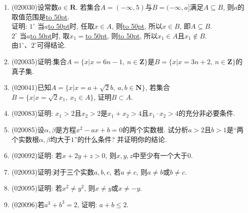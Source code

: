 \documentclass[10pt,a4paper]{article}
\newcommand{\blank}[1]{\underline{\hbox to #1pt{}}}
\begin{document}
\begin{enumerate}[1.]
\item {\tiny (020030)}设常数$a\in \mathbf{R}$. 若集合$A=(-\infty ,5)$与$B=(-\infty ,a]$满足$A\subseteq B$, 则$a$的取值范围是\blank{50}.\\
证明: $1^\circ$ 当$a$\blank{50}时, 任取$x\in A$, 则\blank{50}, 所以$x\in B$, 即$A\subseteq B$.\\ 
$2^\circ$ 当$a$\blank{50}时, 取$x_1=$\blank{50}, 则\blank{50}, 所以$x_1\in A$且$x_1\not \in B$.\\
由$1^\circ$、$2^\circ$可得结论.
\item {\tiny (020035)}证明:集合$A=\{x|x=6n-1, \ n\in\mathbf{Z}\}$是$B=\{x|x=3n+2, \ n\in\mathbf{Z}\}$的真子集.
\vspace*{16ex}
\item {\tiny (020041)}已知$A=\{x|x=a+\sqrt 2b,\ a,b\in \mathbf{N}\}$, 若集合$B=\{x|x=\sqrt 2x_1,\  x_1 \in A\}$, 证明$B\subset A$.
\vspace*{24ex}
\item {\tiny (020083)}证明: $x_1>2$且$x_2>2$是$x_1+x_2>4$且$x_1\cdot x_2>4$的充分非必要条件.
\item {\tiny (020085)}设$\alpha,\beta$是方程$x^2-ax+b=0$的两个实数根. 试分析$a>2$且$b>1$是``两个实数根$\alpha,\beta$均大于$1$''的什么条件? 并证明你的结论.
\item {\tiny (020092)}证明: 若$x+2y+z>0$, 则$x,y,z$中至少有一个大于$0$.
\item {\tiny (020093)}证明:对于三个实数$a,b,c$, 若$a\ne c$, 则$a\ne b$或$b\ne c$.
\item {\tiny (020095)}证明: 若$x^2\ne y^2$, 则$x\ne y$或$x\ne -y$.
\item {\tiny (020096)}若$a^3+b^3=2$, 证明: $a+b\le 2$.
\end{enumerate}
\end{document}
